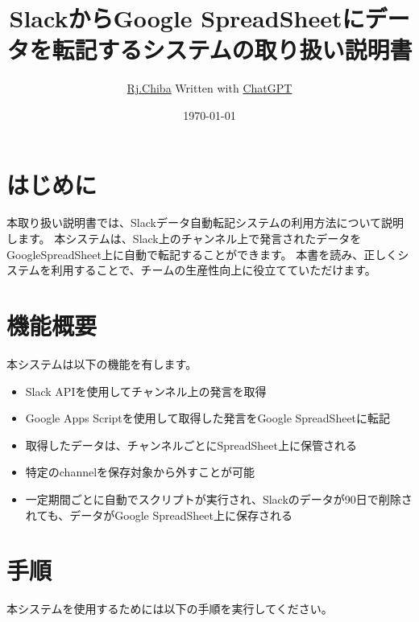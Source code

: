 \documentclass[a4j, 11pt, dvipdfmx]{jsarticle}
\begin{document}
\title{SlackからGoogle SpreadSheetにデータを転記するシステムの取り扱い説明書}
\author{ \href{https://www.twitter.com/rj\_phys}{Rj.Chiba} Written with \href{https://openai.com/blog/chatgpt}{ChatGPT}}
\date{\today}
\maketitle

\section{はじめに}
本取り扱い説明書では、Slackデータ自動転記システムの利用方法について説明します。
本システムは、Slack上のチャンネル上で発言されたデータをGoogleSpreadSheet上に自動で転記することができます。
本書を読み、正しくシステムを利用することで、チームの生産性向上に役立てていただけます。

\section{機能概要}
本システムは以下の機能を有します。

\begin{itemize}
\item Slack APIを使用してチャンネル上の発言を取得
\item Google Apps Scriptを使用して取得した発言をGoogle SpreadSheetに転記
\item 取得したデータは、チャンネルごとにSpreadSheet上に保管される
\item 特定のchannelを保存対象から外すことが可能
\item 一定期間ごとに自動でスクリプトが実行され、Slackのデータが90日で削除されても、データがGoogle SpreadSheet上に保存される
\end{itemize}

\section{手順}
本システムを使用するためには以下の手順を実行してください。
\end{document}
